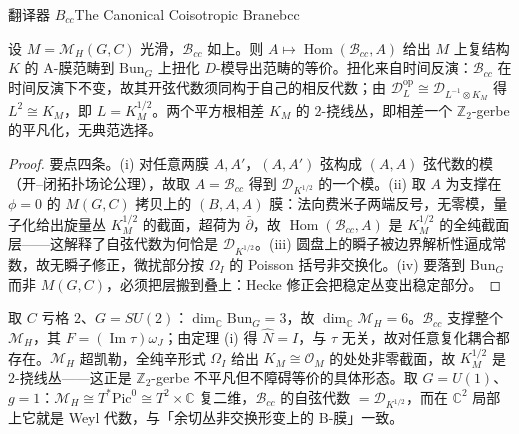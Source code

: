 \begin{centry}{翻译器 $B_{cc}$}{The Canonical Coisotropic Brane}{bcc}
\begin{proposition}[翻译器]
设 $M=\mathcal{M}_H(G,C)$ 光滑，$\mathcal{B}_{cc}$ 如上。则 $A\mapsto\operatorname{Hom}(\mathcal{B}_{cc},A)$ 给出 $M$ 上复结构 $K$ 的 A-膜范畴到 $\mathrm{Bun}_G$ 上扭化 $D$-模导出范畴的等价。扭化来自时间反演：$\mathcal{B}_{cc}$ 在时间反演下不变，故其开弦代数须同构于自己的相反代数；由 $\mathcal{D}_{L}^{\mathrm{op}}\cong\mathcal{D}_{L^{-1}\otimes K_{M}}$ 得 $L^{2}\cong K_{M}$，即 $L=K_{M}^{1/2}$。两个平方根相差 $K_{M}$ 的 $2$-挠线丛，即相差一个 $\mathbb{Z}_{2}$-gerbe 的平凡化，无典范选择。
\end{proposition}
\begin{proof}
要点四条。(i) 对任意两膜 $A,A'$，$(A,A')$ 弦构成 $(A,A)$ 弦代数的模（开--闭拓扑场论公理），故取 $A=\mathcal{B}_{cc}$ 得到 $\mathcal{D}_{K^{1/2}}$ 的一个模。(ii) 取 $A$ 为支撑在 $\phi=0$ 的 $M(G,C)$ 拷贝上的 $(B,A,A)$ 膜：法向费米子两端反号，无零模，量子化给出旋量丛 $K_{M}^{1/2}$ 的截面，超荷为 $\bar\partial$，故 $\operatorname{Hom}(\mathcal{B}_{cc},A)$ 是 $K_{M}^{1/2}$ 的全纯截面层——这解释了自弦代数为何恰是 $\mathcal{D}_{K^{1/2}}$。(iii) 圆盘上的瞬子被边界解析性逼成常数，故无瞬子修正，微扰部分按 $\Omega_{I}$ 的 Poisson 括号非交换化。(iv) 要落到 $\mathrm{Bun}_G$ 而非 $M(G,C)$，必须把层搬到叠上：Hecke 修正会把稳定丛变出稳定部分。
\end{proof}


\begin{example}[$G=SU(2)$、$g=2$]
取 $C$ 亏格 $2$、$G=SU(2)$：$\dim_{\mathbb{C}}\mathrm{Bun}_G=3$，故 $\dim_{\mathbb{C}}\mathcal{M}_H=6$。$\mathcal{B}_{cc}$ 支撑整个 $\mathcal{M}_H$，其 $F=(\operatorname{Im}\tau)\omega_{J}$；由定理 (i) 得 $\hat{N}=I$，与 $\tau$ 无关，故对任意复化耦合都存在。$\mathcal{M}_H$ 超凯勒，全纯辛形式 $\Omega_{I}$ 给出 $K_{M}\cong\mathcal{O}_{M}$ 的处处非零截面，故 $K_{M}^{1/2}$ 是 $2$-挠线丛——这正是 $\mathbb{Z}_{2}$-gerbe 不平凡但不障碍等价的具体形态。取 $G=U(1)$、$g=1$：$\mathcal{M}_H\cong T^{*}\mathrm{Pic}^{0}\cong T^{2}\times\mathbb{C}$ 复二维，$\mathcal{B}_{cc}$ 的自弦代数 $=\mathcal{D}_{K^{1/2}}$，而在 $\mathbb{C}^{2}$ 局部上它就是 Weyl 代数，与「余切丛非交换形变上的 B-膜」一致。
\end{example}


\end{centry}
